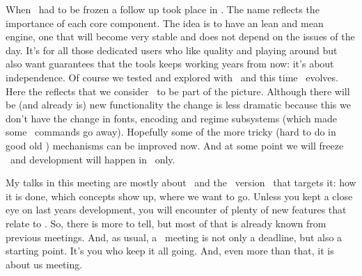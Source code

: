 \stoptitle

\starttitle[title=MKXL (aka LMTX)]

\startitemize
\startitem
    When \LUATEX\ had to be frozen a follow up took place in \LUAMETATEX. The name
    reflects the importance of each core component.
\stopitem
\startitem
    The idea is to have an lean and mean engine, one that will become very stable
    and does not depend on the issues of the day.
\stopitem
\startitem
    It's for all those dedicated users who like quality and playing around but
    also want guarantees that the tools keeps working years from now: it's about
    independence.
\stopitem
\startitem
    Of course we tested and explored with \CONTEXT\ and this time \LMTX\ evolves.
    Here the  reflects that we consider \XML\ to be part of the picture.
\stopitem
\startitem
    Although there will be (and already is) new functionality the change is less
    dramatic because this we don't have the change in fonts, encoding and regime
    subsystems (which made some \MKII\ commands go away).
\stopitem
\startitem
    Hopefully some of the more tricky (hard to do in good old \TEX) mechanisms
    can be improved now.
\stopitem
\startitem
    And at some point we will freeze \MKIV\ and development will happen in \LMTX\
    only.
\stopitem
\stopitemize

\stoptitle

\starttitle[title=This meeting]

\startitemize
\startitem
    My talks in this meeting are mostly about \LUAMETATEX\ and the \CONTEXT\
    version \LMTX\ that targets it: how it is done, which concepts show up, where
    we want to go.
\stopitem
\startitem
    Unless you kept a close eye on last years development, you will encounter of
    plenty of new features that relate to \LUAMETATEX. So, there is more to tell,
    but most of that is already known from previous meetings.
\stopitem
\startitem
    And, as usual, a \CONTEXT\ meeting is not only a deadline, but also a
    starting point. It's you who keep it all going. And, even more than that,
    it is about us meeting.
\stopitem
\stopitemize

\stoptitle

\stopdocument
